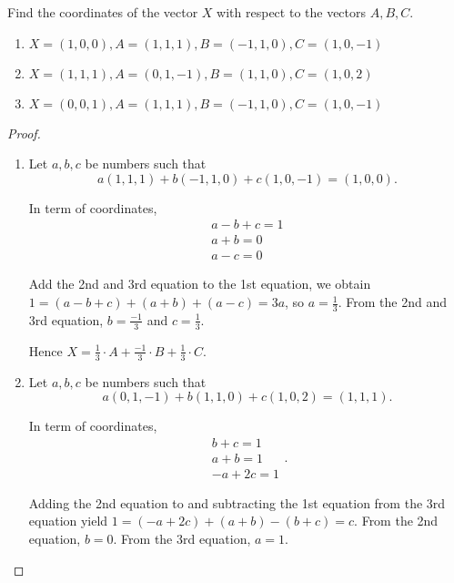 \begin{exercise}
    Find the coordinates of the vector $X$ with respect to the vectors $A, B, C$.
    \begin{enumerate}[label={(\alph*)},itemsep=0pt]
        \item $X = (1, 0, 0), A = (1, 1, 1), B = (-1, 1, 0), C = (1, 0, -1)$
        \item $X = (1, 1, 1), A = (0, 1, -1), B = (1, 1, 0), C = (1, 0, 2)$
        \item $X = (0, 0, 1), A = (1, 1, 1), B = (-1, 1, 0), C = (1, 0, -1)$
    \end{enumerate}
\end{exercise}

\begin{proof}
    \begin{enumerate}[label={(\alph*)},itemsep=0pt]
        \item Let $a, b, c$ be numbers such that
              \[
                  a(1, 1, 1) + b(-1, 1, 0) + c(1, 0, -1) = (1, 0, 0).
              \]

              In term of coordinates,
              \[
                  \begin{split}
                      a - b + c = 1 \\
                      a + b = 0 \\
                      a - c = 0
                  \end{split}
              \]

              Add the 2nd and 3rd equation to the 1st equation, we obtain $1 = (a - b + c) + (a + b) + (a - c) = 3a$, so $a = \frac{1}{3}$. From the 2nd and 3rd equation,  $b = \frac{-1}{3}$ and $c = \frac{1}{3}$.

              Hence $X = \frac{1}{3}\cdot A + \frac{-1}{3}\cdot B + \frac{1}{3}\cdot C$.
        \item Let $a, b, c$ be numbers such that
              \[
                  a(0, 1, -1) + b(1, 1, 0) + c(1, 0, 2) = (1, 1, 1).
              \]

              In term of coordinates,
              \[
                  \begin{split}
                      b + c = 1 \\
                      a + b = 1 \\
                      -a + 2c = 1
                  \end{split}.
              \]

              Adding the 2nd equation to and subtracting the 1st equation from the 3rd equation yield $1 = (-a + 2c) + (a + b) - (b + c) = c$. From the 2nd equation, $b = 0$. From the 3rd equation, $a = 1$.


\end{enumerate}
\end{proof}
